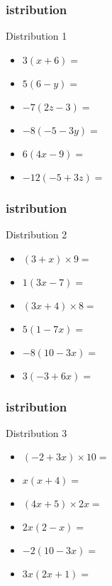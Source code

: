 \documentclass{beamer}
\begin{document}
\begin{frame}
  \frametitle{istribution}
  \begin{exampleblock}{Distribution 1}
    \begin{itemize}
    \item<1-> $ 3(x+ 6)                 = $
    \item<2-> $ 5(6 - y)                = $
    \item<3-> $ -7(2z - 3)              = $
    \item<4-> $ -8(- 5 - 3y)            = $
    \item<5-> $ 6(4x - 9)               = $
    \item<6-> $ - 12(-5 + 3z)           = $
    \end{itemize}
  \end{exampleblock}
\end{frame}

\begin{frame}
  \frametitle{istribution}
  \begin{exampleblock}{Distribution 2}
    \begin{itemize}
    \item<1-> $ (3 + x) \times 9        = $
    \item<2-> $ 1 (3x - 7)               = $
    \item<3-> $ (3x + 4) \times 8         = $
    \item<4-> $ 5(1 - 7x)               = $
    \item<5-> $ -8 (10 - 3x)              = $
    \item<6-> $ 3 (-3 + 6x)             = $
    \end{itemize}
  \end{exampleblock}
\end{frame}

\begin{frame}
  \frametitle{istribution}
  \begin{exampleblock}{Distribution 3}
    \begin{itemize}
    \item<1-> $ (-2 + 3x) \times 10        = $
    \item<2-> $ x (x + 4)               = $
    \item<3-> $ (4x + 5) \times 2x         = $
    \item<4-> $ 2x(2 - x)               = $
    \item<5-> $ -2 (10 - 3x)              = $
    \item<6-> $ 3x (2x + 1)             = $
    \end{itemize}
  \end{exampleblock}
\end{frame}
\end{document}
